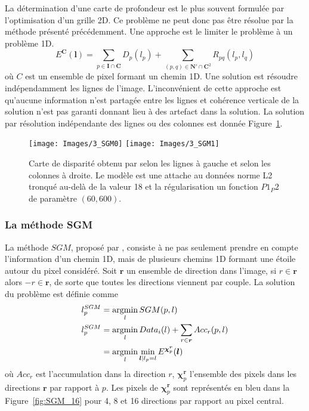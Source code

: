\documentclass[../main/These_Mathias_Paget.tex]{subfiles}
\begin{document}
La détermination d'une carte de profondeur est le plus souvent formulée par l'optimisation d'un grille 2D. Ce problème ne peut donc pas être résolue par la méthode présenté précédemment. Une approche est le limiter le problème à un problème 1D.
	\begin{equation}
	\label{eq:Emulti_1D_1}
	E^{\boldsymbol{C}}(\boldsymbol{l}) = \sum_{p \in \boldsymbol{I} \cap \boldsymbol{C}} D_p(l_p) +  \sum_{(p,q) \in \boldsymbol{N'} \cap \boldsymbol{C}^2} R_{pq}(l_p,l_q)
	\end{equation}
	où $C$ est un ensemble de pixel formant un chemin 1D. Une solution est résoudre indépendamment les lignes de l'image. L'inconvénient de cette approche est qu'aucune information n'est partagée entre les lignes et cohérence verticale de la solution n'est pas garanti donnant lieu à des artefact dans la solution. La solution par résolution indépendante  des lignes ou des colonnes est donnée Figure~\ref{fig:SGM0}.

\begin{figure}
\centering
\texttt{[image: Images/3\_SGM0]}
\texttt{[image: Images/3\_SGM1]}
\caption{Carte de disparité obtenu par selon les lignes à gauche et selon les colonnes à droite. Le modèle est une attache au données norme L2 tronqué au-delà de la valeur 18 et la régularisation un fonction $P1_P2$ de paramètre $(60,600)$.}
\label{fig:SGM0}
\end{figure}	
	
\subsubsection{La méthode SGM}
	
La méthode $SGM$, proposé par \cite{Hirschmuller08PAMI}, consiste à ne pas seulement prendre en compte l'information d'un chemin 1D, mais de plusieurs chemins 1D formant une étoile autour du pixel considéré. Soit $\boldsymbol{r}$ un ensemble de direction dans l'image, si $r \in \boldsymbol{r}$ alors  $-r \in \boldsymbol{r}$, de sorte que toutes les directions viennent par couple. La solution du problème est définie comme
\begin{equation}
\begin{aligned}
l^{SGM}_p &= \argmin_{l}{SGM(p,l)} \\
l^{SGM}_p &= \argmin_{l}{ Data_i(l) + \sum_{r \in \boldsymbol{r}}{Acc_{r}(p,l)}}  \\
&= \argmin_{l}{\min_{\boldsymbol{l}|l_p=l}E^{\boldsymbol{\chi}^{\boldsymbol{r}}_p}(\boldsymbol{l})}
\end{aligned}
\end{equation}
où $Acc_{r}$ est l'accumulation dans la direction $r$, $\boldsymbol{\chi}^{\boldsymbol{r}}_p$ l'ensemble des pixels dans les directions $\boldsymbol{r}$ par rapport à $p$. Les pixels de $\boldsymbol{\chi}^{\boldsymbol{r}}_p$ sont représentés en bleu dans la Figure~\ref{fig:SGM_16} pour 4, 8 et 16 directions par rapport au pixel central.
\end{document}
